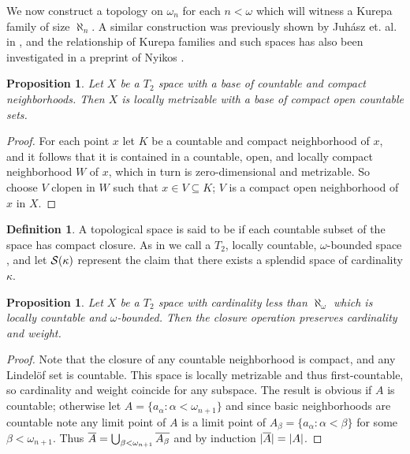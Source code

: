 \documentclass{amsart}
\theoremstyle{plain}
\newtheorem{proposition}[theorem]{Proposition}
\theoremstyle{definition}
\newtheorem{definition}[theorem]{Definition}
\theoremstyle{remark}
\theoremstyle{plain}
\theoremstyle{definition}
\theoremstyle{remark}
\begin{document}
  We now construct a topology on \(\omega_n\) for each \(n<\omega\) which
  will witness a Kurepa family of size \(\aleph_n\). A similar construction
  was previously shown by Juh\'asz et. al. in \cite{MR539228},
  and the relationship of
  Kurepa families and such spaces has also been investigated in a preprint
  of Nyikos \cite{NYIKOSKUREPA}.

  \begin{proposition}
    Let \(X\) be a \(T_2\) space with a base of countable and compact
    neighborhoods. Then \(X\) is locally metrizable with
    a base of compact open countable sets.
  \end{proposition}

  \begin{proof}
    For each point \(x\) let \(K\) be a countable and compact neighborhood
    of \(x\), and it follows that it is contained in a countable, open,
    and locally compact neighborhood \(W\) of \(x\), which in turn
    is zero-dimensional and metrizable. So choose \(V\) clopen
    in \(W\) such that \(x\in V\subseteq K\); \(V\) is a compact open
    neighborhood of \(x\) in \(X\).
  \end{proof}

  \begin{definition}
    A topological space is said to be 
    if each countable subset of the space has compact closure.
    As in \cite{MR539228} we call a
    \(T_2\), locally countable, \(\omega\)-bounded space
    , and let \(\mathcal{S}(\kappa)\) represent
    the claim that there exists a splendid space of cardinality \(\kappa\).
  \end{definition}

  \begin{proposition}
    Let \(X\) be a \(T_2\) space with cardinality less than \(\aleph_\omega\)
    which is locally countable and
    \(\omega\)-bounded. Then the closure operation preserves cardinality and
    weight.
  \end{proposition}

  \begin{proof}
    Note that the closure of any countable neighborhood is compact, and
    any Lindel\"of set is countable. This space is locally metrizable
    and thus first-countable, so cardinality and weight coincide for any
    subspace. The result is obvious if \(A\) is countable; otherwise
    let \(A=\{a_\alpha:\alpha<\omega_{n+1}\}\) and since basic neighborhoods
    are countable note any limit point of \(A\) is
    a limit point of \(A_\beta=\{a_\alpha:\alpha<\beta\}\)
    for some \(\beta<\omega_{n+1}\).
    Thus \(\overline{A}=\bigcup_{\beta<\omega_{n+1}}\overline{A_\beta}\) and
    by induction \(|\overline{A}|=|A|\).
  \end{proof}
\end{document}
